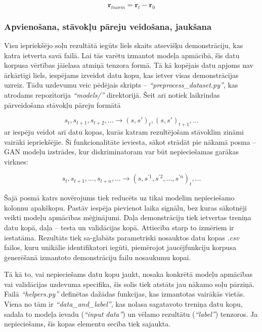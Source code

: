 \documentclass[12pt, a4paper]{article}
\numberwithin{equation}{section} %
\begin{document}
\begin{equation}
     \boldsymbol{r}_{tnorm} =  \boldsymbol{r}_t -  \boldsymbol{r}_0
\end{equation}

\subsubsection{Apvienošana, stāvokļu pāreju veidošana, jaukšana}

Visu iepriekšējo soļu rezultātā iegūts liels skaits atsevišķu demonstrāciju, kas katra ietverta savā failā. Lai tās varētu izmantot modeļa apmācībā, šīs datu korpusa vērtības jāielasa atmiņā tenzora formā. Tā kā kopējais datu apjoms nav ārkārtīgi liels, iespējams izveidot datu kopu, kas ietver visas demonstrācijas uzreiz. Tādu uzdevumu veic pēdējais skripts -- \textit{``preprocess\_dataset.py''}, kas atrodams repozitorija \textit{``models/''} direktorijā. Šeit arī notiek laikrindas pārveidošana stāvokļu pāreju formātā

\begin{equation}
    s_t, s_{t+1}, s_{t+2}, ... \rightarrow (s,s')_t, (s,s')_{t+1}, ...
\end{equation}
ar iespēju veidot arī datu kopas, kurās katram rezultējošam stāvoklim zināmi vairāki iepriekšējie. Šī funkcionalitāte ieviesta, sākot strādāt pie nākamā posma -- GAN modeļu izstrādes, kur diskriminatoram var būt nepieciešamas garākas virknes:

\begin{equation}
    s_t, s_{t+1}, ..., s_{t+n}, ... \rightarrow (s,s^{'1}, s^{'2}, ..., s^{'n})_t, ...
\end{equation}

Šajā posmā katrs novērojums tiek reducēts uz tikai modelim nepieciešamo kolonnu apakškopu. Pastāv iespēja pievienot laika signālu, bez kuras sākotnēji veikti modeļu apmācības mēģinājumi. Daļa demonstrāciju tiek ietvertas treniņa datu kopā, daļa -- testa un validācijas kopā. Attiecība starp to izmēriem ir iestatāma. Rezultāts tiek sa-glabāts parametriski nosauktos datu kopas \textit{.csv} failos, kuru unikālie identifikatori iegūti, piemērojot jaucējfunkciju korpusa ģenerēšanā izmantoto demonstrāciju failu nosaukumu kopai.

Tā kā to, vai nepieciešams datu kopu jaukt, nosaka konkrētā modeļu apmācības vai validācijas uzdevuma specifika, šis solis tiek atstāts jau nākamo soļu pārziņā. Failā \textit{``helpers.py''} definētas dažādas funkcijas, kas izmantotas vairākās vietās. Viena no tām ir \textit{``data\_and\_label''}, kas nolasa sagatavoto treniņa datu kopu, sadala to modeļa ievadu (\textit{``input data''}) un vēlamo rezultātu (\textit{``label''}) tenzoros. Ja nepieciešams, šīs kopas elementu secība tiek sajaukta.
\end{document}
